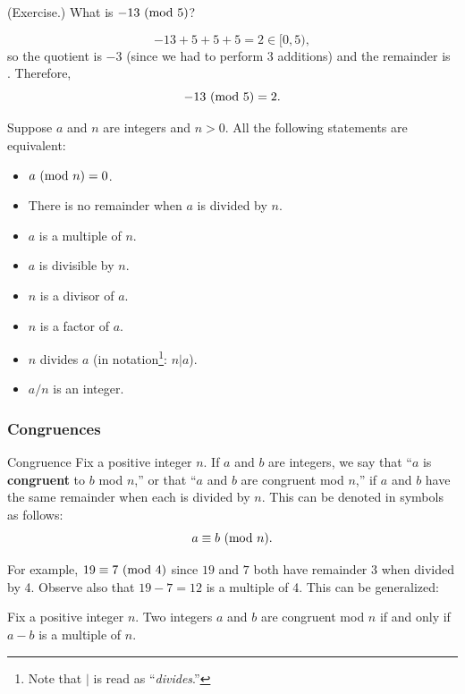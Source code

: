 \documentclass[letterpaper]{article}
\newcommand{\0}{\mathbf{0}}
\begin{document}
\begin{mdframed}
    (Exercise.) What is $-13 \ (\mathrm{mod}\ 5)$?
    \begin{mdframed}
        \[-13 + 5 + 5 + 5 = 2 \in [0, 5),\]
        so the quotient is $-3$ (since we had to perform 3 additions) and the remainder is . Therefore, 
        \[-13 \ (\mathrm{mod}\ 5) = 2.\]
    \end{mdframed}
\end{mdframed}

\begin{proposition}
    Suppose $a$ and $n$ are integers and $n > 0$. All the following statements are equivalent:
    \begin{itemize}
        \item $a \ (\mathrm{mod}\ n) = 0$.
        \item There is no remainder when $a$ is divided by $n$. 
        \item $a$ is a multiple of $n$. 
        \item $a$ is divisible by $n$. 
        \item $n$ is a divisor of $a$. 
        \item $n$ is a factor of $a$. 
        \item $n$ divides $a$ (in notation\footnote{Note that $\vert$ is read as ``\emph{divides}.''}: $n \vert a$).
        \item $a / n$ is an integer.
    \end{itemize}
\end{proposition}

\subsubsection{Congruences}
\begin{definition}{Congruence}{}
    Fix a positive integer $n$. If $a$ and $b$ are integers, we say that ``$a$ is \textbf{congruent} to $b$ mod $n$,'' or that ``$a$ and $b$ are congruent mod $n$,'' if $a$ and $b$ have the same remainder when each is divided by $n$. This can be denoted in symbols as follows: 
    \[a \equiv b \ (\mathrm{mod}\ n).\] 
\end{definition}
For example, $19 \equiv 7 \ (\mathrm{mod}\ 4)$ since $19$ and $7$ both have remainder 3 when divided by 4. Observe also that $19 - 7 = 12$ is a multiple of 4. This can be generalized: 

\begin{lemma}{}{}
    Fix a positive integer $n$. Two integers $a$ and $b$ are congruent mod $n$ if and only if $a - b$ is a multiple of $n$.
\end{lemma}
\end{document}
